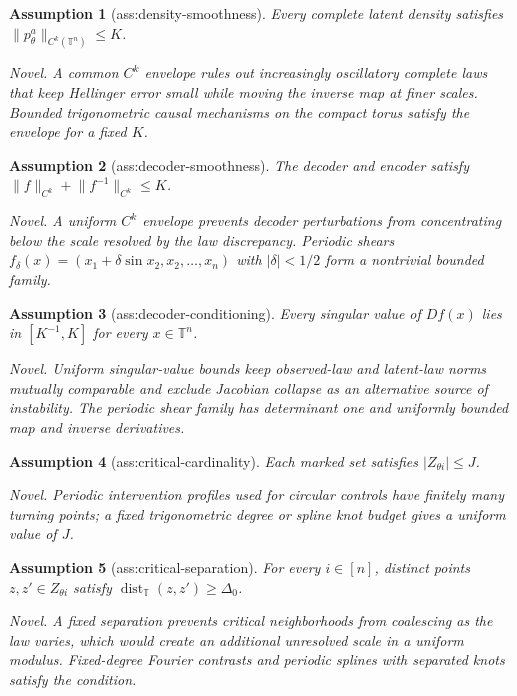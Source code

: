 \documentclass{article}
\newtheorem{assumption}{Assumption}
\begin{document}
\begin{assumption}[ass:density-smoothness]\label{ass:density-smoothness}
Every complete latent density satisfies \(\lVert p_\theta^a\rVert_{C^k(\mathbb T^n)}\le K\).
\par\smallskip\noindent\emph{Novel.} A common \(C^k\) envelope rules out increasingly oscillatory complete laws that keep Hellinger error small while moving the inverse map at finer scales. Bounded trigonometric causal mechanisms on the compact torus satisfy the envelope for a fixed \(K\).
\end{assumption}

\begin{assumption}[ass:decoder-smoothness]\label{ass:decoder-smoothness}
The decoder and encoder satisfy \(\lVert f\rVert_{C^k}+\lVert f^{-1}\rVert_{C^k}\le K\).
\par\smallskip\noindent\emph{Novel.} A uniform \(C^k\) envelope prevents decoder perturbations from concentrating below the scale resolved by the law discrepancy. Periodic shears \(f_\delta(x)=(x_1+\delta\sin x_2,x_2,\ldots,x_n)\) with \(|\delta|<1/2\) form a nontrivial bounded family.
\end{assumption}

\begin{assumption}[ass:decoder-conditioning]\label{ass:decoder-conditioning}
Every singular value of \(Df(x)\) lies in \([K^{-1},K]\) for every \(x\in\mathbb T^n\).
\par\smallskip\noindent\emph{Novel.} Uniform singular-value bounds keep observed-law and latent-law norms mutually comparable and exclude Jacobian collapse as an alternative source of instability. The periodic shear family has determinant one and uniformly bounded map and inverse derivatives.
\end{assumption}

\begin{assumption}[ass:critical-cardinality]\label{ass:critical-cardinality}
Each marked set satisfies \(|Z_{\theta i}|\le J\).
\par\smallskip\noindent\emph{Novel.} Periodic intervention profiles used for circular controls have finitely many turning points; a fixed trigonometric degree or spline knot budget gives a uniform value of \(J\).
\end{assumption}

\begin{assumption}[ass:critical-separation]\label{ass:critical-separation}
For every \(i\in[n]\), distinct points \(z,z'\in Z_{\theta i}\) satisfy \(\operatorname{dist}_{\mathbb T}(z,z')\ge\Delta_0\).
\par\smallskip\noindent\emph{Novel.} A fixed separation prevents critical neighborhoods from coalescing as the law varies, which would create an additional unresolved scale in a uniform modulus. Fixed-degree Fourier contrasts and periodic splines with separated knots satisfy the condition.
\end{assumption}
\end{document}
